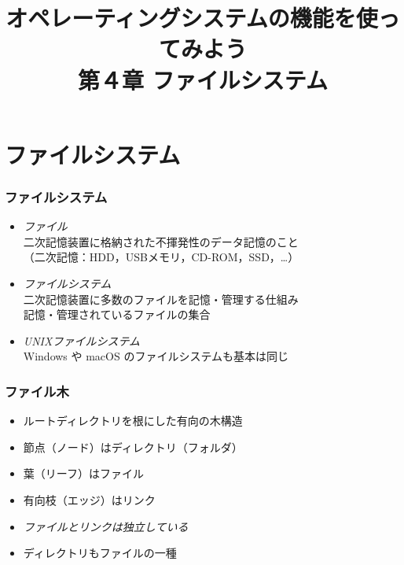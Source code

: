 \documentclass{beamer}                 %
\begin{document}
\title{オペレーティングシステムの機能を使ってみよう\\
第４章 ファイルシステム}
\date{}

\begin{frame}
  \titlepage
\end{frame}


\section{ファイルシステム}
\begin{frame}[fragile]
  \frametitle{ファイルシステム}
  \begin{itemize}
    \item \emph{ファイル}\\
      二次記憶装置に格納された不揮発性のデータ記憶のこと\\
      （二次記憶：HDD，USBメモリ，CD-ROM，SSD，…）
    \item \emph{ファイルシステム}\\
      二次記憶装置に多数のファイルを記憶・管理する仕組み\\
      記憶・管理されているファイルの集合
    \item \emph{UNIXファイルシステム}\\
      Windows や macOS のファイルシステムも基本は同じ
  \end{itemize}
\end{frame}

\begin{frame}[fragile]
  \frametitle{ファイル木}

  \begin{itemize}
  \item ルートディレクトリを根にした有向の木構造
  \item 節点（ノード）はディレクトリ（フォルダ）
  \item 葉（リーフ）はファイル
  \item 有向枝（エッジ）はリンク
  \item \emph{ファイルとリンクは独立している}
  \item ディレクトリもファイルの一種
  \end{itemize}
\end{frame}
\end{document}
